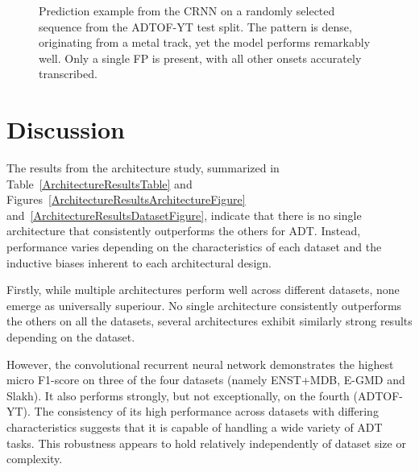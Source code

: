 \begin{figure}[H]
    \centering
    \caption{Prediction example from the \acrfull{CRNN} on a randomly selected sequence from the ADTOF-YT test split. The pattern is dense, originating from a metal track, yet the model performs remarkably well. Only a single \acrfull{FP} is present, with all other onsets accurately transcribed.}
    \label{ArchitecturePredictionComparisonADTOF-YTFigure}
\end{figure}

\section{Discussion}

The results from the architecture study, summarized in Table~\ref{ArchitectureResultsTable} and Figures~\ref{ArchitectureResultsArchitectureFigure} and~\ref{ArchitectureResultsDatasetFigure}, indicate that there is no single architecture that consistently outperforms the others for \gls{ADT}. Instead, performance varies depending on the characteristics of each dataset and the inductive biases inherent to each architectural design.

Firstly, while multiple architectures perform well across different datasets, none emerge as universally superiour. No single architecture consistently outperforms the others on all the datasets, several architectures exhibit similarly strong results depending on the dataset. 

However, the convolutional recurrent neural network demonstrates the highest micro F1-score on three of the four datasets (namely ENST+MDB, E-GMD and Slakh). It also performs strongly, but not exceptionally, on the fourth (ADTOF-YT). The consistency of its high performance across datasets with differing characteristics suggests that it is capable of handling a wide variety of \gls{ADT} tasks. This robustness appears to hold relatively independently of dataset size or complexity. 


